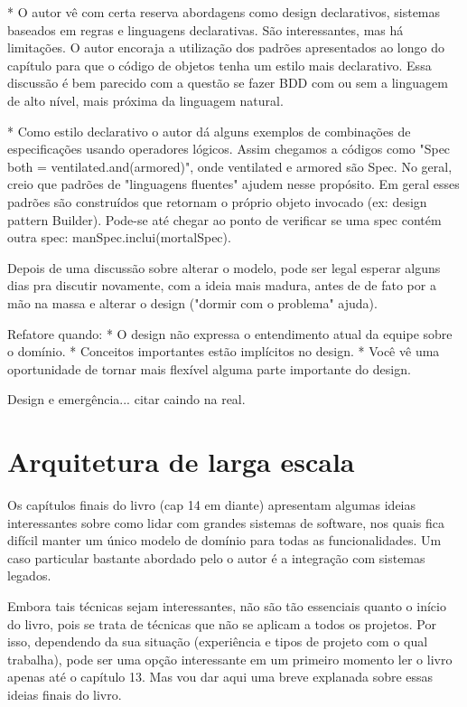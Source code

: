\documentclass[a4paper, 12pt]{article}
\begin{document}
* O autor vê com certa reserva abordagens como design declarativos, sistemas baseados em regras e linguagens declarativas. São interessantes, mas há limitações. O autor encoraja a utilização dos padrões apresentados ao longo do capítulo para que o código de objetos tenha um estilo mais declarativo. Essa discussão é bem parecido com a questão se fazer BDD com ou sem a linguagem de alto nível, mais próxima da linguagem natural.

* Como estilo declarativo o autor dá alguns exemplos de combinações de especificações usando operadores lógicos. Assim chegamos a códigos como "Spec both = ventilated.and(armored)", onde ventilated e armored são Spec. No geral, creio que padrões de "linguagens fluentes" ajudem nesse propósito. Em geral esses padrões são construídos que retornam o próprio objeto invocado (ex: design pattern Builder). Pode-se até chegar ao ponto de verificar se uma spec contém outra spec: manSpec.inclui(mortalSpec).

Depois de uma discussão sobre alterar o modelo, pode ser legal esperar alguns dias pra discutir novamente, com a ideia mais madura, antes de de fato por a mão na massa e alterar o design ("dormir com o problema" ajuda).

Refatore quando:
* O design não expressa o entendimento atual da equipe sobre o domínio.
* Conceitos importantes estão implícitos no design.
* Você vê uma oportunidade de tornar mais flexível alguma parte importante do design.

Design e emergência... citar caindo na real.

\section{Arquitetura de larga escala}

Os capítulos finais do livro (cap 14 em diante) apresentam algumas ideias interessantes sobre como lidar com grandes sistemas de software, nos quais fica difícil manter um único modelo de domínio para todas as funcionalidades. Um caso particular bastante abordado pelo o autor é a integração com sistemas legados.

Embora tais técnicas sejam interessantes, não são tão essenciais quanto o início do livro, pois se trata de técnicas que não se aplicam a todos os projetos. Por isso, dependendo da sua situação (experiência e tipos de projeto com o qual trabalha), pode ser uma opção interessante em um primeiro momento ler o livro apenas até o capítulo 13. Mas vou dar aqui uma breve explanada sobre essas ideias finais do livro.
\end{document}
